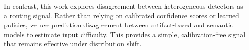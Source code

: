 \documentclass{ieeeaccess}
\begin{document}
In contrast, this work explores disagreement between heterogeneous detectors as a routing signal. Rather than relying on calibrated confidence scores or learned policies, we use prediction disagreement between artifact-based and semantic models to estimate input difficulty. This provides a simple, calibration-free signal that remains effective under distribution shift.

\begin{table}[h]
\centering
\small %
\caption{Comparative analysis of related AI-generated media detection approaches. \checkmark~indicates capability is present; \texttimes~indicates absent.}
\label{tab:litsurvey}
\setlength{\tabcolsep}{4pt} %



\end{table}
\end{document}
